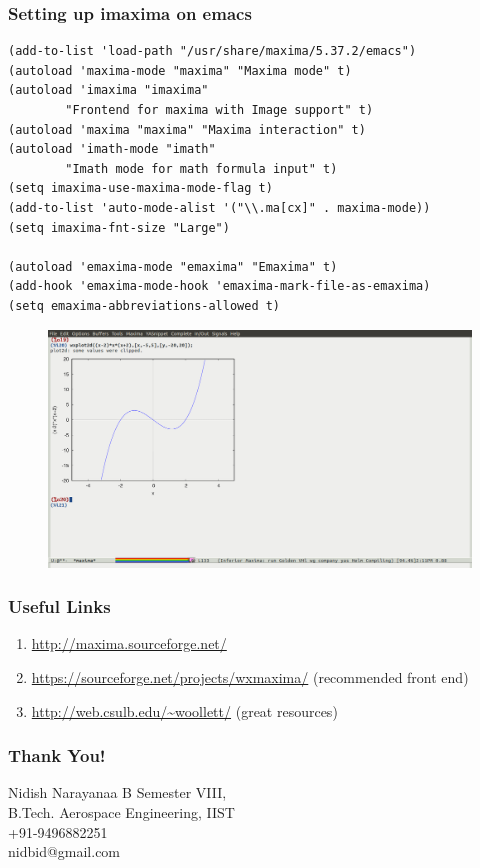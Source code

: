 \documentclass[12pt,usenames,pdftex]{beamer}
\begin{document}
\begin{frame}
  \frametitle{Setting up imaxima on emacs}
  \begin{footnotesize}
\begin{verbatim}
(add-to-list 'load-path "/usr/share/maxima/5.37.2/emacs")
(autoload 'maxima-mode "maxima" "Maxima mode" t)
(autoload 'imaxima "imaxima" 
        "Frontend for maxima with Image support" t)
(autoload 'maxima "maxima" "Maxima interaction" t)
(autoload 'imath-mode "imath" 
        "Imath mode for math formula input" t)
(setq imaxima-use-maxima-mode-flag t)
(add-to-list 'auto-mode-alist '("\\.ma[cx]" . maxima-mode))
(setq imaxima-fnt-size "Large")

(autoload 'emaxima-mode "emaxima" "Emaxima" t)
(add-hook 'emaxima-mode-hook 'emaxima-mark-file-as-emaxima)
(setq emaxima-abbreviations-allowed t)
\end{verbatim}
  \end{footnotesize}

  \begin{figure}
    \centering
    \includegraphics[width=\linewidth]{Figs/imaxima_demo}
  \end{figure}
\end{frame}

\begin{frame}[fragile]
  \frametitle{Useful Links}
  \begin{enumerate}
  \item \url{http://maxima.sourceforge.net/}
  \item \url{https://sourceforge.net/projects/wxmaxima/} (recommended
    front end)
  \item \url{http://web.csulb.edu/~woollett/} (great resources)
  \end{enumerate}
\end{frame}

\begin{frame}
  \frametitle{Thank You!}
  \begin{center}
    \begin{block}{Nidish Narayanaa B}
      Semester VIII,\\
      B.Tech. Aerospace Engineering, IIST\\
      +91-9496882251\\
      nidbid@gmail.com
    \end{block}
  \end{center}
\end{frame}
\end{document}
